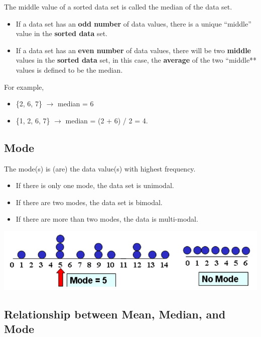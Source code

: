 \documentclass[
]{book}
\providecommand{\tightlist}{%
  \setlength{\itemsep}{0pt}\setlength{\parskip}{0pt}}
\begin{document}
The middle value of a sorted data set is called the median of the data set.

\begin{itemize}
\item
  If a data set has an \textbf{odd number} of data values, there is a unique ``middle'' value in the \textbf{sorted data} set.
\item
  If a data set has an \textbf{even number} of data values, there will be two \textbf{middle} values in the \textbf{sorted data} set, in this case, the \textbf{average} of the two ``middle** values is defined to be the median.
\end{itemize}

For example,

\begin{itemize}
\item
  \{2, 6, 7\} \(\to\) median = 6
\item
  \{1, 2, 6, 7\} \(\to\) median = (2 + 6) / 2 = 4.
\end{itemize}

\hypertarget{mode}{%
\subsection{Mode}\label{mode}}

The mode(s) is (are) the data value(s) with highest frequency.

\begin{itemize}
\tightlist
\item
  If there is only one mode, the data set is unimodal.
\item
  If there are two modes, the data set is bimodal.
\item
  If there are more than two modes, the data is multi-modal.
\end{itemize}

\begin{center}\includegraphics[width=0.55\linewidth]{week02/mode} \end{center}

\hypertarget{relationship-between-mean-median-and-mode}{%
\subsection{Relationship between Mean, Median, and Mode}\label{relationship-between-mean-median-and-mode}}
\end{document}
